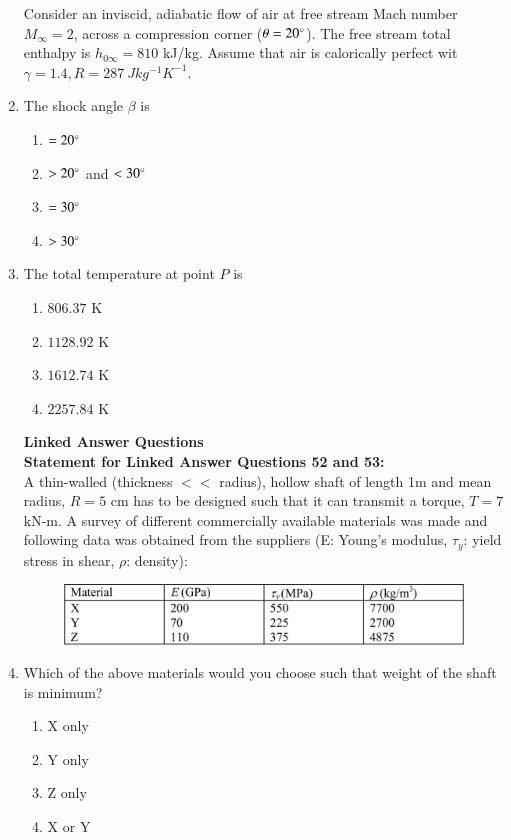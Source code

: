 \documentclass{article}
\begin{document}
\begin{enumerate}
Consider an inviscid, adiabatic flow of air at free stream Mach number $M_\infty=2$, across a compression corner ($\theta=20\degree$). The free stream total enthalpy is $h_{0\infty}=810$ kJ/kg. Assume that air is calorically perfect wit $\gamma = 1.4, R = 287\ J kg^{-1}K^{-1}$.

\item The shock angle $\beta$ is
\begin{multicols}{4}
\begin{enumerate}
\item $= 20\degree$
\item $> 20\degree$ and $< 30\degree$
\item $= 30\degree$
\item $> 30\degree$
\end{enumerate}
\end{multicols}

\item The total temperature at point $P$ is
\begin{multicols}{4}
\begin{enumerate}
\item $806.37$ K
\item $1128.92$ K
\item $1612.74$ K
\item $2257.84$ K
\end{enumerate}
\end{multicols}

\textbf{Linked Answer Questions}\\

\textbf{Statement for Linked Answer Questions 52 and 53:}\\

A thin-walled (thickness $<<$ radius), hollow shaft of length 1m and mean radius, $R = 5$ cm has to be designed such that it can transmit a torque, $T = 7$ kN-m. A survey of different commercially available materials was made and following data was obtained from the suppliers (E: Young’s modulus, $\tau_y$: yield stress in shear, $\rho$: density):
\begin{figure}[H]
    \centering
    \includegraphics[width=0.5\linewidth]{tables/q52 53.png}
    \caption{}
    \label{fig:q52 53}
\end{figure}

\item Which of the above materials would you choose such that weight of the shaft is minimum? 
 \begin{multicols}{4}
    \begin{enumerate}        
        \item X only 
        \item Y only 
        \item Z only 
        \item X or Y
    \end{enumerate}
 \end{multicols}


\end{enumerate}
\end{document}
